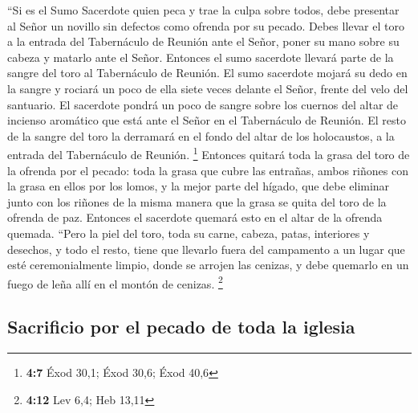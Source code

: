  ``Si es el Sumo Sacerdote quien peca y trae la culpa
sobre todos, debe presentar al Señor un novillo sin defectos como
ofrenda por su pecado.  Debes llevar el toro a la entrada
del Tabernáculo de Reunión ante el Señor, poner su mano sobre su cabeza
y matarlo ante el Señor.  Entonces el sumo sacerdote
llevará parte de la sangre del toro al Tabernáculo de Reunión.
 El sumo sacerdote mojará su dedo en la sangre y rociará
un poco de ella siete veces delante el Señor, frente del velo del
santuario.  El sacerdote pondrá un poco de sangre sobre
los cuernos del altar de incienso aromático que está ante el Señor en el
Tabernáculo de Reunión. El resto de la sangre del toro la derramará en
el fondo del altar de los holocaustos, a la entrada del Tabernáculo de
Reunión. \footnote{\textbf{4:7} Éxod 30,1; Éxod 30,6; Éxod 40,6}
 Entonces quitará toda la grasa del toro de la ofrenda por
el pecado: toda la grasa que cubre las entrañas,  ambos
riñones con la grasa en ellos por los lomos, y la mejor parte del
hígado, que debe eliminar junto con los riñones  de la
misma manera que la grasa se quita del toro de la ofrenda de paz.
Entonces el sacerdote quemará esto en el altar de la ofrenda quemada.
 ``Pero la piel del toro, toda su carne, cabeza, patas,
interiores y desechos,  y todo el resto, tiene que
llevarlo fuera del campamento a un lugar que esté ceremonialmente
limpio, donde se arrojen las cenizas, y debe quemarlo en un fuego de
leña allí en el montón de cenizas. \footnote{\textbf{4:12} Lev 6,4; Heb
  13,11}

\hypertarget{sacrificio-por-el-pecado-de-toda-la-iglesia}{%
\subsection{Sacrificio por el pecado de toda la
iglesia}\label{sacrificio-por-el-pecado-de-toda-la-iglesia}}


